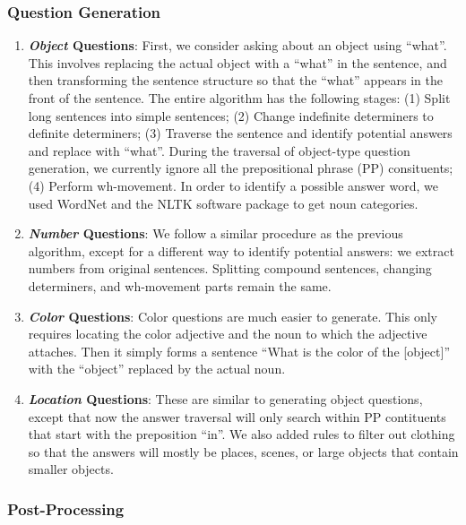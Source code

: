 \documentclass{article} %
\renewcommand{\#}[1]{\textbf{#1}}
\begin{document}
\subsubsection{Question Generation}

\begin{enumerate}[leftmargin=*]

\item \textbf{{\it Object} Questions}: First, we consider asking about an
object using ``what''. This involves replacing the actual object with a
``what'' in the sentence, and then transforming the sentence structure so that
the ``what'' appears in the front of the sentence. The entire algorithm has the
following stages: (1) Split long sentences into simple sentences; (2) Change
indefinite determiners to definite determiners; (3) Traverse the sentence and
identify potential answers and replace with ``what''. During the traversal of
object-type question generation, we currently ignore all the prepositional
phrase (PP) consituents; (4) Perform wh-movement. In order to identify a
possible answer word, we used WordNet \cite{wordnet} and the NLTK software
package \cite{nltk} to get noun categories.

\item \textbf{{\it Number} Questions}: We follow a similar procedure as the
previous algorithm, except for a different way to identify potential answers:
we extract numbers from original sentences. Splitting compound sentences,
changing determiners, and wh-movement parts remain the same.

\item \textbf{{\it Color} Questions}: Color questions are much easier to
generate. This only requires locating the color adjective and the noun to which
the adjective attaches. Then it simply forms a sentence ``What is the color of
the [object]'' with the ``object'' replaced by the actual noun.

\item \textbf{{\it Location} Questions}: These are similar to generating object
questions, except that now the answer traversal will only search within PP
contituents that start with the preposition ``in''. We also added rules to
filter out clothing so that the answers will mostly be places, scenes, or large
objects that contain smaller objects.

\end{enumerate}

\subsubsection{Post-Processing}
\end{document}
